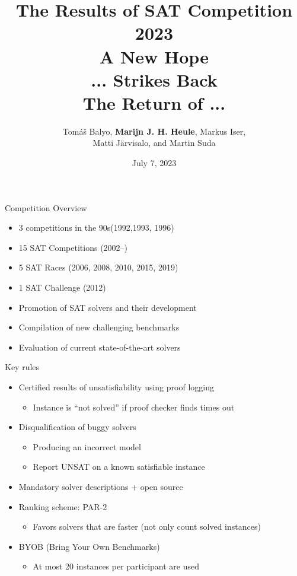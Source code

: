 \documentclass{beamer}
\title[SAT Competition 2023]{{\bf The Results of SAT Competition 2023}\\A New Hope\\... Strikes Back\\The Return of ...}
\author[Balyo, Heule, Iser, J\"{a}rvisalo, Suda] {Tom{\'a}{\v s} Balyo, {\bf Marijn J. H. Heule},
{ Markus Iser},\\ Matti J\"{a}rvisalo, and Martin Suda}
\institute[] %
{\Large 
SAT 2023 Conference, Alghero (Italy) \\ %
}
\date{July 7, 2023} %
\begin{document}
\begin{frame}
\titlepage %
\end{frame}

\begin{frame}{Competition Overview}

\begin{itemize}
\item 3 competitions in the 90s\hfill (1992,1993, 1996)
\item 15 SAT Competitions \hfill (2002--)
\item 5 SAT Races \hfill (2006, 2008, 2010, 2015, 2019)
\item 1 SAT Challenge \hfill (2012)
\end{itemize}

\bigskip
\bigskip

\begin{itemize}
\item Promotion of SAT solvers and their development
\item Compilation of new challenging benchmarks
\item Evaluation of current state-of-the-art solvers
\end{itemize}

\end{frame}


\begin{frame}{Key rules}
\begin{itemize}
\item Certified results of unsatisfiability using proof logging
  \begin{itemize}
  \item Instance is ``not solved'' if proof checker finds times out
  \end{itemize}
\medskip
\item Disqualification of buggy solvers
  \begin{itemize}
  \item Producing an incorrect model
  \item Report UNSAT on a known satisfiable instance
  \end{itemize}
\medskip
\item Mandatory solver descriptions + open source
\medskip
\item Ranking scheme: PAR-2
\begin{itemize}
\item Favors solvers that are faster (not only count solved instances)
\end{itemize}
\medskip
\item BYOB (Bring Your Own Benchmarks)
\begin{itemize}
\item At most 20 instances per participant are used
\end{itemize} 
\end{itemize}
\end{frame}
\end{document}

